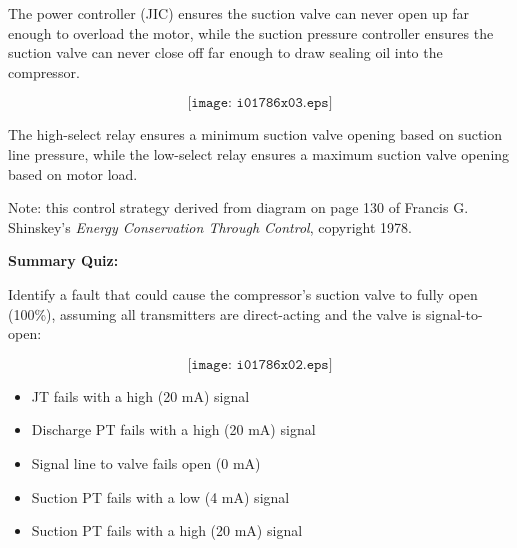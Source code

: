 





The power controller (JIC) ensures the suction valve can never open up far enough to overload the motor, while the suction pressure controller ensures the suction valve can never close off far enough to draw sealing oil into the compressor.

$$\texttt{[image: i01786x03.eps]}$$







The high-select relay ensures a minimum suction valve opening based on suction line pressure, while the low-select relay ensures a maximum suction valve opening based on motor load.

\vskip 30pt

Note: this control strategy derived from diagram on page 130 of Francis G. Shinskey's {\it Energy Conservation Through Control}, copyright 1978.

\vfil \eject

\noindent
{\bf Summary Quiz:}

Identify a fault that could cause the compressor's suction valve to fully open (100\%), assuming all transmitters are direct-acting and the valve is signal-to-open:

$$\texttt{[image: i01786x02.eps]}$$

\begin{itemize}
\item{} JT fails with a high (20 mA) signal
\vskip 5pt 
\item{} Discharge PT fails with a high (20 mA) signal
\vskip 5pt 
\item{} Signal line to valve fails open (0 mA)
\vskip 5pt 
\item{} Suction PT fails with a low (4 mA) signal
\vskip 5pt 
\item{} Suction PT fails with a high (20 mA) signal
\end{itemize}





